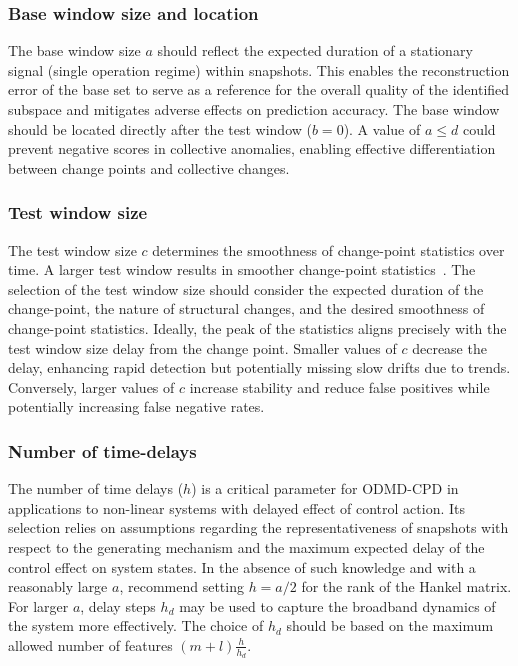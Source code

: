 \subsubsection{Base window size and location}\label{sec:base-window}
The base window size \(a\) should reflect the expected duration of a stationary signal (single operation regime) within snapshots. This enables the reconstruction error of the base set to serve as a reference for the overall quality of the identified subspace and mitigates adverse effects on prediction accuracy. The base window should be located directly after the test window (\(b = 0\)). A value of \(a \leq d\) could prevent negative scores in collective anomalies, enabling effective differentiation between change points and collective changes.

\subsubsection{Test window size}
The test window size \(c\) determines the smoothness of change-point statistics over time. A larger test window results in smoother change-point statistics~\cite{Moskvina2003}. The selection of the test window size should consider the expected duration of the change-point, the nature of structural changes, and the desired smoothness of change-point statistics. Ideally, the peak of the statistics aligns precisely with the test window size delay from the change point. Smaller values of \(c\) decrease the delay, enhancing rapid detection but potentially missing slow drifts due to trends. Conversely, larger values of \(c\) increase stability and reduce false positives while potentially increasing false negative rates.

\subsubsection{Number of time-delays}
The number of time delays (\(h\)) is a critical parameter for ODMD-CPD in applications to non-linear systems with delayed effect of control action. Its selection relies on assumptions regarding the representativeness of snapshots with respect to the generating mechanism and the maximum expected delay of the control effect on system states. In the absence of such knowledge and with a reasonably large \(a\), \cite{Moskvina2003} recommend setting \(h = a / 2\) for the rank of the Hankel matrix. For larger \(a\), delay steps \(h_d\) may be used to capture the broadband dynamics of the system more effectively. The choice of \(h_d\) should be based on the maximum allowed number of features \((m + l)\frac{h}{h_d}\).


